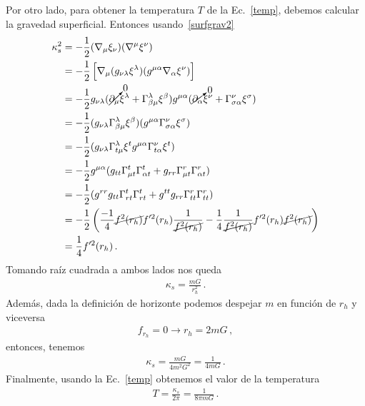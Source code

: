 \documentclass[../Main.tex]{subfiles}
\begin{document}
Por otro lado, para obtener la temperatura $T$ de la Ec.~\eqref{temp}, debemos calcular la gravedad superficial. Entonces usando~\eqref{surfgrav2} 
\begin{align} \notag
\kappa^{2}_{s}&=-\frac{1}{2}(\nabla_{\mu}\xi_{\nu})(\nabla^{\mu}\xi^{\nu})\\ \notag
&=-\frac{1}{2}\left[\nabla_{\mu}(g_{\nu\lambda}\xi^{\lambda})(g^{\mu\alpha}\nabla_{\alpha}\xi^{\nu})\right]\\ \notag
&=-\frac{1}{2}g_{\nu\lambda}(\cancelto{0}{\partial_{\mu}}\xi^{\lambda}+\Gamma^{\lambda}_{\beta\mu}\xi^{\beta})g^{\mu\alpha}(\cancelto{0}{\partial_{\alpha}}\xi^{\nu}+\Gamma^{\nu}_{\sigma\alpha}\xi^{\sigma})\\ \notag
&=-\frac{1}{2}(g_{\nu\lambda}\Gamma^{\lambda}_{\beta\mu}\xi^{\beta})(g^{\mu\alpha}\Gamma^{\nu}_{\sigma\alpha}\xi^{\sigma})\\ \notag
&=-\frac{1}{2}(g_{\nu\lambda}\Gamma^{\lambda}_{t\mu}\xi^{t}g^{\mu\alpha}\Gamma^{\nu}_{t\alpha}\xi^{t})\\ \notag
&=-\frac{1}{2}g^{\mu\alpha}(g_{tt}\Gamma^{t}_{\mu t}\Gamma^{t}_{\alpha t}+g_{rr}\Gamma^{r}_{\mu t}\Gamma^{r}_{\alpha t})\\ \notag
&=-\frac{1}{2}(g^{rr}g_{tt}\Gamma^{t}_{rt}\Gamma^{t}_{rt}+g^{tt}g_{rr}\Gamma^{r}_{tt}\Gamma^{r}_{tt})\\ \notag
&=-\frac{1}{2}\left(\frac{-1}{4}\cancel{f^{2}(r_{h})}f'^{2}(r_{h})\frac{1}{\cancel{f^{2}(r_{h})}}-\frac{1}{4}\frac{1}{\cancel{f^{2}(r_{h})}}f'^{2}(r_{h})\cancel{f^{2}(r_{h})}\right)\\ 
&=\frac{1}{4}f'^{2}(r_{h})\, .
\end{align}
Tomando raíz cuadrada a ambos lados nos queda 
\begin{align}
    \kappa_{s}=\frac{mG}{r^2_{h}}\, .
\end{align}
Además, dada la definición de horizonte podemos despejar $m$ en función de $r_h$ y viceversa 
\begin{align}
    f_{r_h}=0 \to r_{h}=2mG\, ,
\end{align}
entonces, tenemos
\begin{align}
    \kappa_{s}=\frac{mG}{4m^2 G^2}=\frac{1}{4mG}\, .
\end{align}
Finalmente, usando la Ec.~\eqref{temp} obtenemos el valor de la temperatura
\begin{align}
    T=\frac{\kappa_{s}}{2\pi}=\frac{1}{8\pi mG}\, . \label{temp2}
\end{align}
\end{document}
